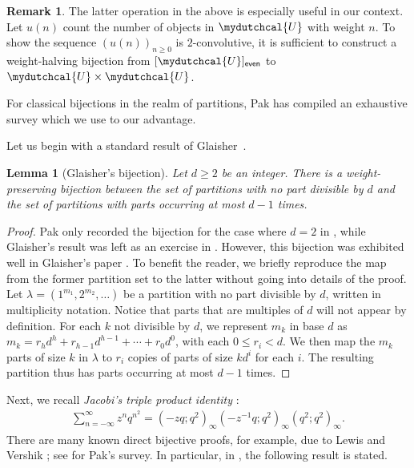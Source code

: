 \documentclass[12pt,reqno]{amsart}
\numberwithin{equation}{section}
\theoremstyle{plain}
\newtheorem{lemma}[theorem]{Lemma}
\theoremstyle{definition}
\newtheorem{remark}[theorem]{Remark}
\theoremstyle{named}
\newcommand{\cU}{\mydutchcal{U}}
\newcommand{\even}{\mathsf{even}}
\begin{document}
\begin{remark}\label{rmk:weight-halving}
	The latter operation in the above is especially useful in our context. Let $u(n)$ count the number of objects in $\cU$ with weight $n$. To show the sequence $(u(n))_{n\ge 0}$ is $2$-convolutive, it is sufficient to construct a weight-halving bijection from $[\cU]_\even$ to $\cU\times \cU$.
\end{remark}

For classical bijections in the realm of partitions, Pak has compiled an exhaustive survey \cite{Pak2006} which we use to our advantage.

Let us begin with a standard result of Glaisher~\cite[p.~163]{Gla1883}.

\begin{lemma}[Glaisher's bijection]\label{le:Glaisher-bij}
	Let $d\ge 2$ be an integer. There is a weight-preserving bijection between the set of partitions with no part divisible by $d$ and the set of partitions with parts occurring at most $d-1$ times.
\end{lemma}

\begin{proof}
	Pak only recorded the bijection for the case where $d=2$ in \cite[p.~23, Sect.~3.2.1]{Pak2006}, while Glaisher's result was left as an exercise in \cite[p.~23, Sect.~3.2.3]{Pak2006}. However, this bijection was exhibited well in Glaisher's paper \cite[p.~162]{Gla1883}. To benefit the reader, we briefly reproduce the map from the former partition set to the latter without going into details of the proof. Let $\lambda = (1^{m_1},2^{m_2},\ldots)$ be a partition with no part divisible by $d$, written in multiplicity notation. Notice that parts that are multiples of $d$ will not appear by definition. For each $k$ not divisible by $d$, we represent $m_k$ in base $d$ as $m_k = r_hd^h + r_{h-1}d^{h-1} + \cdots + r_0d^0$, with each $0\le r_i< d$. We then map the $m_k$ parts of size $k$ in $\lambda$ to $r_i$ copies of parts of size $k d^i$ for each $i$. 
    The resulting partition thus has parts occurring at most $d-1$ times.
\end{proof}


Next, we recall \emph{Jacobi's triple product identity} \cite[p.~21, eq.~(2.2.10)]{And1998}:  
\begin{align*}
	\sum_{n=-\infty}^\infty z^n q^{n^2} = (-zq;q^2)_\infty(-z^{-1}q;q^2)_\infty(q^2;q^2)_\infty.
\end{align*}
There are many known direct bijective proofs, for example, due to Lewis \cite{Lew1984} and Vershik \cite{Ver1988}; see \cite[Sect.~6.2]{Pak2006} for Pak's survey. In particular, 
in \cite[Sect.~6.2.2]{Pak2006}, the following result is stated.
\end{document}
